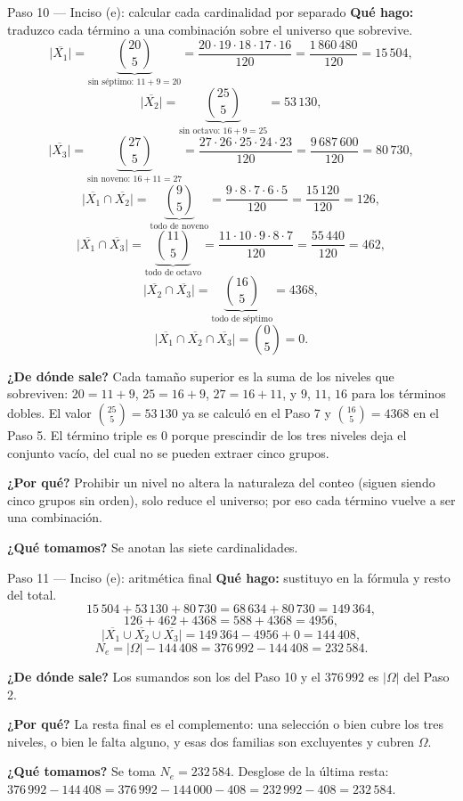 \documentclass[11pt]{article}
\begin{document}
\begin{paso}{Paso 10 --- Inciso (e): calcular cada cardinalidad por separado}
\textbf{Qué hago:} traduzco cada término a una combinación sobre el universo que sobrevive.
\[
  \big|\overline{X_1}\big| = \underbrace{\binom{20}{5}}_{\text{sin séptimo: }11+9=20} = \frac{20\cdot 19\cdot 18\cdot 17\cdot 16}{120}=\frac{1\,860\,480}{120}=15\,504 ,
\]
\[
  \big|\overline{X_2}\big| = \underbrace{\binom{25}{5}}_{\text{sin octavo: }16+9=25} = 53\,130 ,
\]
\[
  \big|\overline{X_3}\big| = \underbrace{\binom{27}{5}}_{\text{sin noveno: }16+11=27} = \frac{27\cdot 26\cdot 25\cdot 24\cdot 23}{120}=\frac{9\,687\,600}{120}=80\,730 ,
\]
\[
  \big|\overline{X_1}\cap \overline{X_2}\big| = \underbrace{\binom{9}{5}}_{\text{todo de noveno}} = \frac{9\cdot 8\cdot 7\cdot 6\cdot 5}{120}=\frac{15\,120}{120}=126 ,
\]
\[
  \big|\overline{X_1}\cap \overline{X_3}\big| = \underbrace{\binom{11}{5}}_{\text{todo de octavo}} = \frac{11\cdot 10\cdot 9\cdot 8\cdot 7}{120}=\frac{55\,440}{120}=462 ,
\]
\[
  \big|\overline{X_2}\cap \overline{X_3}\big| = \underbrace{\binom{16}{5}}_{\text{todo de séptimo}} = 4368 ,
\]
\[
  \big|\overline{X_1}\cap \overline{X_2}\cap \overline{X_3}\big| = \binom{0}{5} = 0 .
\]

\textbf{¿De dónde sale?} Cada tamaño superior es la suma de los niveles que sobreviven: $20=11+9$, $25=16+9$, $27=16+11$, y $9$, $11$, $16$ para los términos dobles. El valor $\binom{25}{5}=53\,130$ ya se calculó en el Paso 7 y $\binom{16}{5}=4368$ en el Paso 5. El término triple es $0$ porque prescindir de los tres niveles deja el conjunto vacío, del cual no se pueden extraer cinco grupos.

\textbf{¿Por qué?} Prohibir un nivel no altera la naturaleza del conteo (siguen siendo cinco grupos sin orden), solo reduce el universo; por eso cada término vuelve a ser una combinación.

\textbf{¿Qué tomamos?} Se anotan las siete cardinalidades.
\end{paso}

\begin{paso}{Paso 11 --- Inciso (e): aritmética final}
\textbf{Qué hago:} sustituyo en la fórmula y resto del total.
\[
  15\,504+53\,130+80\,730 = 68\,634+80\,730 = 149\,364 ,
\]
\[
  126+462+4368 = 588+4368 = 4956 ,
\]
\[
  \big|\overline{X_1}\cup \overline{X_2}\cup \overline{X_3}\big| = 149\,364 - 4956 + 0 = 144\,408 ,
\]
\[
  N_e = |\Omega| - 144\,408 = 376\,992 - 144\,408 = 232\,584 .
\]

\textbf{¿De dónde sale?} Los sumandos son los del Paso 10 y el $376\,992$ es $|\Omega|$ del Paso 2.

\textbf{¿Por qué?} La resta final es el complemento: una selección o bien cubre los tres niveles, o bien le falta alguno, y esas dos familias son excluyentes y cubren $\Omega$.

\textbf{¿Qué tomamos?} Se toma $N_e = 232\,584$. Desglose de la última resta: $376\,992-144\,408 = 376\,992-144\,000-408 = 232\,992-408 = 232\,584$.
\end{paso}
\end{document}
